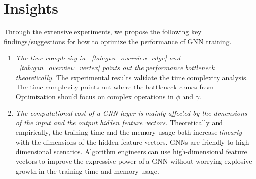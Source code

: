 \section{Insights}
\label{sec:insights}

Through the extensive experiments, we propose the following key findings/suggestions for how to optimize the performance of GNN training.

\begin{enumerate}
    \item \emph{The time complexity in \tablename~\ref{tab:gnn_overview_edge} and \tablename~\ref{tab:gnn_overview_vertex} points out the performance bottleneck theoretically.}
          The experimental results validate the time complexity analysis.
          The time complexity points out where the bottleneck comes from.
          Optimization should focus on complex operations in $\phi$ and $\gamma$.

    \item \emph{The computational cost of a GNN layer is mainly affected by the dimensions of the input and the output hidden feature vectors.}
          Theoretically and empirically, the training time and the memory usage both increase \emph{linearly} with the dimensions of the hidden feature vectors.
          GNNs are friendly to high-dimensional scenarios.
          Algorithm engineers can use high-dimensional feature vectors to improve the expressive power of a GNN without worrying explosive growth in the training time and memory usage.


\end{enumerate}
